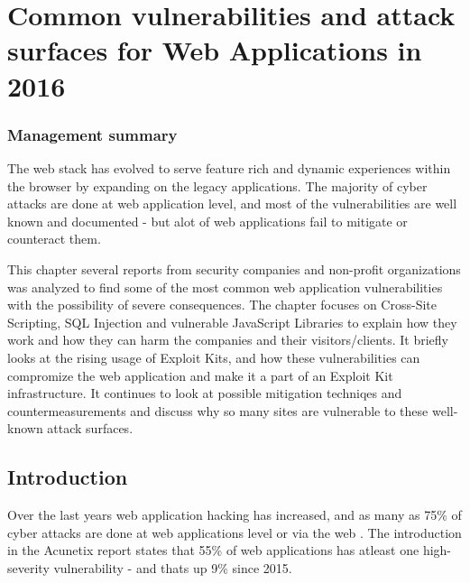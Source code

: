 \chapter[Web Application vulnerabilities in 2016]{Common vulnerabilities and attack surfaces for Web Applications in 2016}

\subsection*{Management summary}
The web stack has evolved to serve feature rich and dynamic experiences within the browser by expanding on the legacy applications. The majority of cyber attacks are done at web application level, and most of the vulnerabilities are well known and documented - but alot of web applications fail to mitigate or counteract them.

This chapter several reports from security companies and non-profit organizations was analyzed to find some of the most common web application vulnerabilities with the possibility of severe consequences. The chapter focuses on Cross-Site Scripting, SQL Injection and vulnerable JavaScript Libraries to explain how they work and how they can harm the companies and their visitors/clients. It briefly looks at the rising usage of Exploit Kits, and how these vulnerabilities can compromize the web application and make it a part of an Exploit Kit infrastructure. It continues to look at possible mitigation techniqes and countermeasurements and discuss why so many sites are vulnerable to these well-known attack surfaces.
\pagebreak
\section{Introduction}
Over the last years web application hacking has increased, and as many as 75\% of cyber attacks are done at web applications level or via the web \cite{AcunetixCompany}. The introduction in the Acunetix report states that 55\% of web applications has atleast one high-severity vulnerability - and thats up 9\% since 2015.

